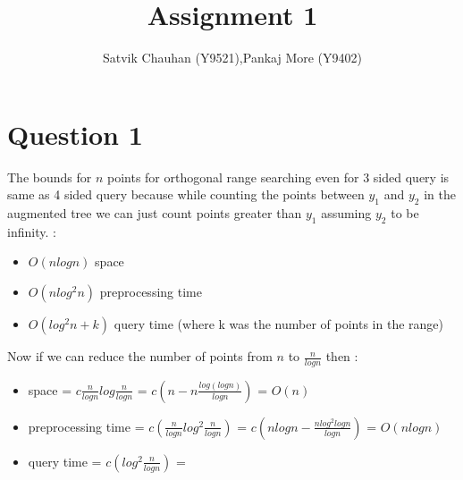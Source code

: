 \documentclass{article}
\title{Assignment 1}
\author{Satvik Chauhan (Y9521),Pankaj More (Y9402)}
\date{}
\begin{document}
\maketitle
\section*{Question 1}
The bounds for $n$ points for orthogonal range searching even for 3 sided query is same as 4 sided query because while counting the points between $y_1$ and $y_2$ in the augmented tree we can just count points greater than $y_1$ assuming $y_2$ to be infinity.  :
\begin{itemize}
\item $O(nlog n)$ space 
\item $O(nlog^2 n)$ preprocessing time 
\item $O(log^2 n + k)$ query time (where k was the number of points in the range)
\end{itemize}
Now if we can reduce the number of points from $n$ to $\frac{n}{log n}$ then :
\begin{itemize}
\item space = $c\frac{n}{log n}log \frac{n}{log n}$ = $c(n - n\frac{log (log n)}{log n})$ = $O(n)$
\item preprocessing time = $c(\frac{n}{log n}log^2 \frac{n}{log n})$ = $c(nlog n - \frac{nlog^2 log n}{log n})$ = $O(nlog n)$
\item query time = $c(log^2 \frac{n}{log n})$ = 
\end{itemize}
\end{document}
